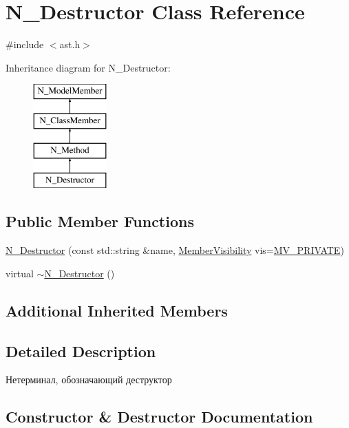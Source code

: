 \hypertarget{classN__Destructor}{}\section{N\+\_\+\+Destructor Class Reference}
\label{classN__Destructor}


{\ttfamily \#include $<$ast.\+h$>$}

Inheritance diagram for N\+\_\+\+Destructor\+:\begin{figure}[H]
\begin{center}
\leavevmode
\includegraphics[height=4.000000cm]{classN__Destructor}
\end{center}
\end{figure}
\subsection*{Public Member Functions}
\begin{DoxyCompactItemize}
\item 
\hyperlink{classN__Destructor_aa57bd73ddebd0cf0ff3f28a7fb0fabd0}{N\+\_\+\+Destructor} (const std\+::string \&name, \hyperlink{ast_8h_a8cf536792064de0e4fc620bc6f1dc90e}{Member\+Visibility} vis=\hyperlink{ast_8h_a8cf536792064de0e4fc620bc6f1dc90eae560d950ff759756c70399d8cfe015d0}{M\+V\+\_\+\+P\+R\+I\+V\+A\+T\+E})
\item 
virtual \hyperlink{classN__Destructor_a6575c6a0505d9ffa3efdaaa9c150d4a3}{$\sim$\+N\+\_\+\+Destructor} ()
\end{DoxyCompactItemize}
\subsection*{Additional Inherited Members}


\subsection{Detailed Description}
Нетерминал, обозначающий деструктор 

\subsection{Constructor \& Destructor Documentation}
\hypertarget{classN__Destructor_aa57bd73ddebd0cf0ff3f28a7fb0fabd0}{}
